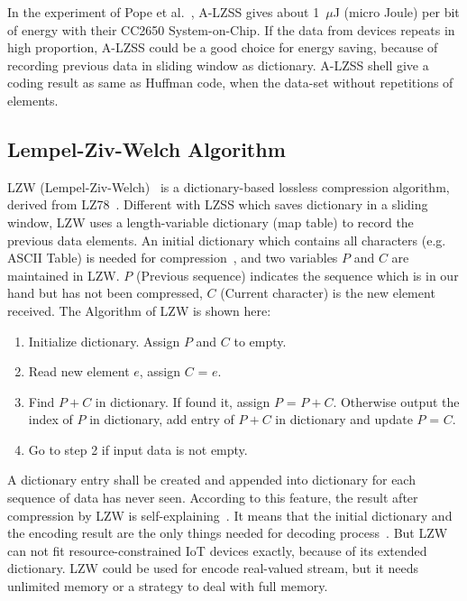 In the experiment of Pope et al.~\cite{pope2018accelerometer}, A-LZSS gives
about 1~$\mu$J (micro Joule) per bit of energy with their CC2650 System-on-Chip. If the data from devices
repeats in high proportion, A-LZSS could be a good choice for energy
saving, because of recording previous data in sliding window as dictionary.
A-LZSS shell give a coding result as same as Huffman code, when the data-set without repetitions of elements.


\subsection{Lempel-Ziv-Welch Algorithm}
LZW (Lempel-Ziv-Welch)~\cite{welch1984technique} is a dictionary-based lossless compression
algorithm, derived from LZ78~\cite{ziv1978compression}. Different with LZSS
which saves dictionary in a sliding window, LZW uses a length-variable
dictionary (map table) to record the previous data elements. An initial
dictionary which contains all characters (e.g. ASCII Table) is needed for
compression~\cite{welch1984technique}, and two variables $P$ and $C$ are
maintained in LZW. $P$ (Previous sequence) indicates the sequence which is in our hand
but has not been compressed, $C$ (Current character) is the new element received. The
Algorithm of LZW is shown here:

\begin{enumerate}
    \item Initialize dictionary. Assign $P$ and $C$ to empty.
    \item Read new element $e$, assign $C$ = $e$.
    \item Find $P+C$ in dictionary. If found it, assign $P$ = $P+C$. Otherwise
    output the index of $P$ in dictionary, add entry of $P+C$ in dictionary and
    update $P$ = $C$.
    \item Go to step 2 if input data is not empty.
\end{enumerate}

A dictionary entry shall be created and appended into dictionary for each
sequence of data has never seen. According to this feature, the result after
compression by LZW is self-explaining~\cite{welch1984technique}. It means
that the initial dictionary and the encoding result are the only things
needed for decoding process~\cite{welch1984technique}. But LZW can not fit
resource-constrained IoT devices exactly, because of its extended dictionary.
LZW could be used for encode real-valued stream, but it needs unlimited memory
or a strategy to deal with full memory.

